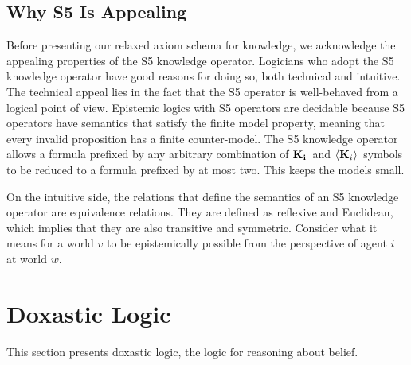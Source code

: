 \subsection{Why S5 Is Appealing} 
Before presenting our relaxed axiom schema for knowledge, we acknowledge the appealing properties of the S5 knowledge operator. Logicians who adopt the S5 knowledge operator have good reasons for doing so, both technical and intuitive. The technical appeal lies in the fact that the S5 operator is well-behaved from a logical point of view. Epistemic logics with S5 operators are decidable because S5 operators have semantics that satisfy the finite model property, meaning that every invalid proposition has a finite counter-model. The S5 knowledge operator allows a formula prefixed by any arbitrary combination of $\mathbf{K}_{\mathbf{i}}\,$ and $\langle \mathbf{K}_{i} \rangle\,$ symbols to be reduced to a formula prefixed by at most two. This keeps the models small.

On the intuitive side, the relations that define the semantics of an S5 knowledge operator are equivalence relations. They are defined as reflexive and Euclidean, which implies that they are also transitive and symmetric. Consider what it means for a world $v$ to be epistemically possible from the perspective of agent $i$ at world $w$.

\section{Doxastic Logic}
This section presents doxastic logic, the logic for reasoning about belief.




